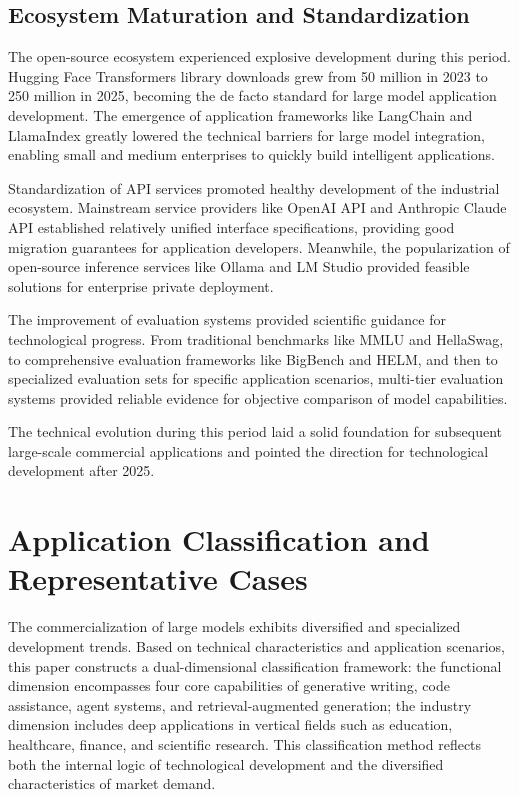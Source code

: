 \documentclass{article}
\begin{document}
\subsection{Ecosystem Maturation and Standardization}
The open-source ecosystem experienced explosive development during this period. Hugging Face Transformers library downloads grew from 50 million in 2023 to 250 million in 2025, becoming the de facto standard for large model application development. The emergence of application frameworks like LangChain and LlamaIndex greatly lowered the technical barriers for large model integration, enabling small and medium enterprises to quickly build intelligent applications.

Standardization of API services promoted healthy development of the industrial ecosystem. Mainstream service providers like OpenAI API and Anthropic Claude API established relatively unified interface specifications, providing good migration guarantees for application developers. Meanwhile, the popularization of open-source inference services like Ollama and LM Studio provided feasible solutions for enterprise private deployment.

The improvement of evaluation systems provided scientific guidance for technological progress. From traditional benchmarks like MMLU and HellaSwag, to comprehensive evaluation frameworks like BigBench and HELM, and then to specialized evaluation sets for specific application scenarios, multi-tier evaluation systems provided reliable evidence for objective comparison of model capabilities.

The technical evolution during this period laid a solid foundation for subsequent large-scale commercial applications and pointed the direction for technological development after 2025. 

\section{Application Classification and Representative Cases}
The commercialization of large models exhibits diversified and specialized development trends. Based on technical characteristics and application scenarios, this paper constructs a dual-dimensional classification framework: the functional dimension encompasses four core capabilities of generative writing, code assistance, agent systems, and retrieval-augmented generation; the industry dimension includes deep applications in vertical fields such as education, healthcare, finance, and scientific research. This classification method reflects both the internal logic of technological development and the diversified characteristics of market demand.
\end{document}
